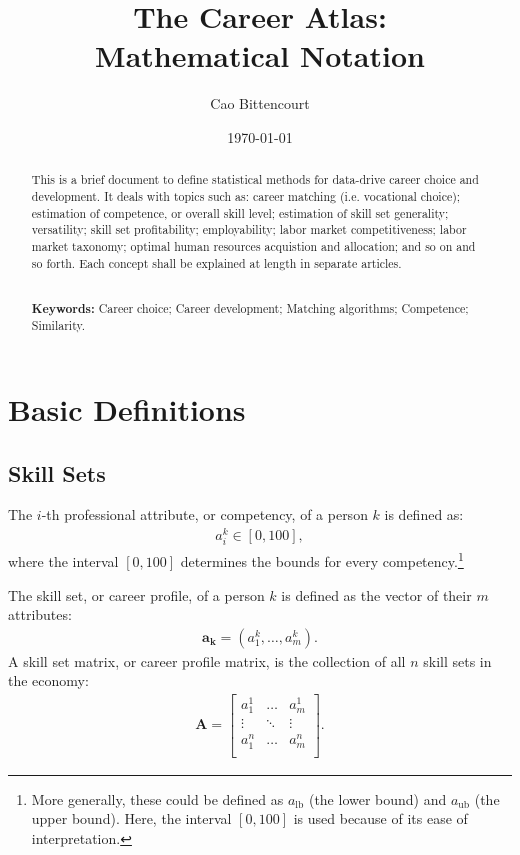 \documentclass{elsarticle} %
\title{
    The Career Atlas:\\
    Mathematical Notation
}
\author{Cao Bittencourt}
\affiliation{{B. Sc. in Economics from EPGE (FGV), RJ, Brazil.}}
\affiliation{{Statistician at Atlas Career Guide Inc., FL, USA.}}
\date{\today}
\begin{document}

\begin{abstract}
    \noindent
    This is a brief document to define statistical methods for data-drive career choice and development. It deals with topics such as: career matching (i.e. vocational choice); estimation of competence, or overall skill level; estimation of skill set generality; versatility; skill set profitability; employability; labor market competitiveness; labor market taxonomy; optimal human resources acquistion and allocation; and so on and so forth. Each concept shall be explained at length in separate articles.

    \noindent
    \\ \textbf{Keywords:} Career choice; Career development; Matching algorithms; Competence; Similarity.
\end{abstract}

\maketitle

\section{Basic Definitions}
\subsection{Skill Sets}
The $i$-th professional attribute, or competency, of a person $k$ is defined
as:
\begin{gather}
    a_{i}^{k}
    \in [0, 100]
    ,
\end{gather}
where the interval $[0,100]$ determines the bounds for every competency.\footnote[1]{
    More generally, these could be defined as $a_\text{lb}$ (the lower bound) and $a_\text{ub}$ (the upper bound). Here, the interval $[0,100]$ is used because of its ease of interpretation.
}

The skill set, or career profile, of a person $k$ is defined as the vector of
their $m$ attributes:
\begin{gather}
    \boldsymbol{a_k} = (a_{1}^{k}, \dots, a_{m}^{k})
    .
\end{gather}
A skill set matrix, or career profile matrix, is the collection of all $n$ skill sets in the economy:
\begin{gather}
    \textbf{A} =
    \begin{bmatrix}
        a_{1}^{1} & \hdots & a_{m}^{1} \\
        \vdots    & \ddots & \vdots    \\
        a_{1}^{n} & \hdots & a_{m}^{n} \\
    \end{bmatrix}
    .
\end{gather}
\end{document}

